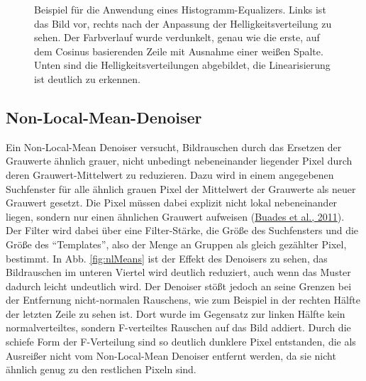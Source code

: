 \documentclass[
  12pt,
  openany]{book}
\begin{document}
\begin{figure}
{}

\caption[Beispiel für die Anwendung eines Histogramm-Equalizers.]{Beispiel für die Anwendung eines Histogramm-Equalizers. Links ist das Bild vor, rechts nach der Anpassung der Helligkeitsverteilung zu sehen. Der Farbverlauf wurde verdunkelt, genau wie die erste, auf dem Cosinus basierenden Zeile mit Ausnahme einer weißen Spalte. Unten sind die Helligkeitsverteilungen abgebildet, die Linearisierung ist deutlich zu erkennen.}\label{fig:histEqual}
\end{figure}

\hypertarget{non-local-mean-denoiser}{%
\subsection{Non-Local-Mean-Denoiser}\label{non-local-mean-denoiser}}

Ein Non-Local-Mean Denoiser versucht, Bildrauschen durch das Ersetzen der Grauwerte ähnlich grauer, nicht unbedingt nebeneinander liegender Pixel durch deren Grauwert-Mittelwert zu reduzieren. Dazu wird in einem angegebenen Suchfenster für alle ähnlich grauen Pixel der Mittelwert der Grauwerte als neuer Grauwert gesetzt. Die Pixel müssen dabei explizit nicht lokal nebeneinander liegen, sondern nur einen ähnlichen Grauwert aufweisen (\protect\hyperlink{ref-buadesNonLocalMeansDenoising2011}{Buades et al., 2011}).
Der Filter wird dabei über eine Filter-Stärke, die Größe des Suchfensters und die Größe des ``Templates'', also der Menge an Gruppen als gleich gezählter Pixel, bestimmt. \newline
In Abb. \ref{fig:nlMeans} ist der Effekt des Denoisers zu sehen, das Bildrauschen im unteren Viertel wird deutlich reduziert, auch wenn das Muster dadurch leicht undeutlich wird. Der Denoiser stößt jedoch an seine Grenzen bei der Entfernung nicht-normalen Rauschens, wie zum Beispiel in der rechten Hälfte der letzten Zeile zu sehen ist. Dort wurde im Gegensatz zur linken Hälfte kein normalverteiltes, sondern F-verteiltes Rauschen auf das Bild addiert. Durch die schiefe Form der F-Verteilung sind so deutlich dunklere Pixel entstanden, die als Ausreißer nicht vom Non-Local-Mean Denoiser entfernt werden, da sie nicht ähnlich genug zu den restlichen Pixeln sind.
\end{document}
